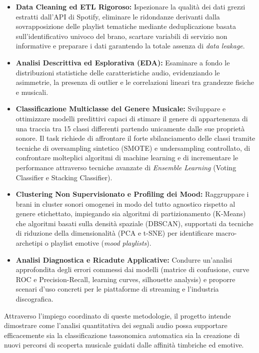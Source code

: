\documentclass[12pt,a4paper]{article}
\begin{document}
\begin{itemize}
    \item \textbf{Data Cleaning ed ETL Rigoroso:} Ispezionare la qualità dei dati grezzi estratti dall'API di Spotify, eliminare le ridondanze derivanti dalla sovrapposizione delle playlist tematiche mediante deduplicazione basata sull'identificativo univoco del brano, scartare variabili di servizio non informative e preparare i dati garantendo la totale assenza di \textit{data leakage}.
    \item \textbf{Analisi Descrittiva ed Esplorativa (EDA):} Esaminare a fondo le distribuzioni statistiche delle caratteristiche audio, evidenziando le asimmetrie, la presenza di outlier e le correlazioni lineari tra grandezze fisiche e musicali.
    \item \textbf{Classificazione Multiclasse del Genere Musicale:} Sviluppare e ottimizzare modelli predittivi capaci di stimare il genere di appartenenza di una traccia tra 15 classi differenti partendo unicamente dalle sue proprietà sonore. Il task richiede di affrontare il forte sbilanciamento delle classi tramite tecniche di oversampling sintetico (SMOTE) e undersampling controllato, di confrontare molteplici algoritmi di machine learning e di incrementare le performance attraverso tecniche avanzate di \textit{Ensemble Learning} (Voting Classifier e Stacking Classifier).
    \item \textbf{Clustering Non Supervisionato e Profiling dei Mood:} Raggruppare i brani in cluster sonori omogenei in modo del tutto agnostico rispetto al genere etichettato, impiegando sia algoritmi di partizionamento (K-Means) che algoritmi basati sulla densità spaziale (DBSCAN), supportati da tecniche di riduzione della dimensionalità (PCA e t-SNE) per identificare macro-archetipi o playlist emotive (\textit{mood playlists}).
    \item \textbf{Analisi Diagnostica e Ricadute Applicative:} Condurre un'analisi approfondita degli errori commessi dai modelli (matrice di confusione, curve ROC e Precision-Recall, learning curves, silhouette analysis) e proporre scenari d'uso concreti per le piattaforme di streaming e l'industria discografica.
\end{itemize}

Attraverso l'impiego coordinato di queste metodologie, il progetto intende dimostrare come l'analisi quantitativa dei segnali audio possa supportare efficacemente sia la classificazione tassonomica automatica sia la creazione di nuovi percorsi di scoperta musicale guidati dalle affinità timbriche ed emotive.
\end{document}
